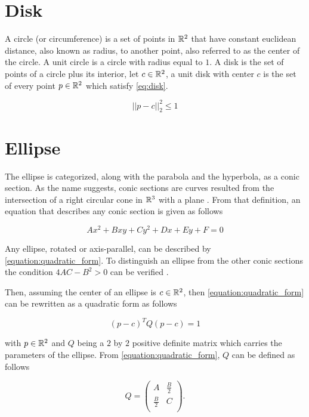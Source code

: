 \section{Disk}

A circle (or circumference) is a set of points in $\mathbb{R}^2$ that have constant euclidean distance, also known as radius, to another point, also referred to as the center of the circle. A unit circle is a circle with radius equal to $1$.
A disk is the set of points of a circle plus its interior, let $c \in \mathbb{R}^2$, a unit disk with center $c$ is the set of every point $p \in \mathbb{R}^2$ which satisfy \autoref{eq:disk}.

\begin{equation}\label{eq:disk}
||p-c||_2^2 \le 1
\end{equation} 

\section{Ellipse}

The ellipse is categorized, along with the parabola and the hyperbola, as a conic section. As the name suggests, conic sections are curves resulted from the intersection of a right circular cone in $\mathbb{R}^3$ with a plane \cite{brannan:geometry}. From that definition, an equation that describes any conic section is given as follows

\begin{equation}\label{equation:quadratic_form}
Ax^2 + Bxy + Cy^2 + Dx + Ey + F = 0
\end{equation}

Any ellipse, rotated or axis-parallel, can be described by \autoref{equation:quadratic_form}. To distinguish an ellipse from the other conic sections the condition $4AC - B^2>0$ can be verified \cite{ayoub}.

Then, assuming the center of an ellipse is $c \in \mathbb{R}^2$, then \autoref{equation:quadratic_form} can be rewritten as a quadratic form as follows

\begin{equation}
(p-c)^{T}Q(p-c) = 1
\end{equation}

with $p \in \mathbb{R}^2$ and $Q$ being a $2$ by $2$ positive definite matrix which carries the parameters of the ellipse. From \autoref{equation:quadratic_form}, $Q$ can be defined as follows

\[
Q=
\left( {\begin{array}{cc}
	A & \frac{B}{2} \\
	\frac{B}{2} & C \\
	\end{array} } \right).
\]

